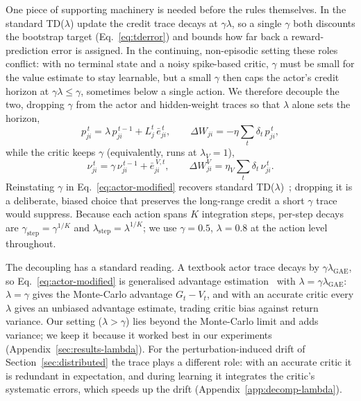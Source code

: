 \documentclass[10pt,twocolumn]{article}
\begin{document}
One piece of supporting machinery is needed before the rules themselves. In the
standard TD($\lambda$) update the credit trace decays at $\gamma\lambda$, so a
single $\gamma$ both discounts the bootstrap target (Eq.~\eqref{eq:tderror}) and
bounds how far back a reward-prediction error is assigned. In the continuing,
non-episodic setting these roles conflict: with no terminal state and a noisy
spike-based critic, $\gamma$ must be small for the value estimate to stay
learnable, but a small $\gamma$ then caps the actor's credit horizon at
$\gamma\lambda\le\gamma$, sometimes below a single action. We therefore decouple
the two, dropping $\gamma$ from the actor and hidden-weight traces so that
$\lambda$ alone sets the horizon,
\begin{equation}
p^{\,t}_{ji} = \lambda\, p^{\,t-1}_{ji} + L^t_j\,\bar e^{\,t}_{ji},
\qquad \Delta W_{ji} = -\eta\sum_t \delta_t\, p^{\,t}_{ji},
\label{eq:actor-modified}
\end{equation}
while the critic keeps $\gamma$ (equivalently, runs at $\lambda_V=1$),
\begin{equation}
\nu^{\,t}_{ji} = \gamma\,\nu^{\,t-1}_{ji} + \bar e^{\,V,t}_{ji},
\qquad \Delta W^V_{ji} = \eta_V\sum_t \delta_t\,\nu^{\,t}_{ji}.
\label{eq:critic-modified}
\end{equation}
Reinstating $\gamma$ in Eq.~\eqref{eq:actor-modified} recovers standard
TD($\lambda$)~\citep{SuttonBarto2018}; dropping it is a deliberate, biased choice that preserves the
long-range credit a short $\gamma$ trace would suppress. Because each action
spans $K$ integration steps, per-step decays are
$\gamma_{\mathrm{step}}=\gamma^{1/K}$ and
$\lambda_{\mathrm{step}}=\lambda^{1/K}$; we use $\gamma=0.5$, $\lambda=0.8$
at the action level throughout.

The decoupling has a standard reading. A textbook actor trace decays by
$\gamma\lambda_{\mathrm{GAE}}$, so Eq.~\eqref{eq:actor-modified} is generalised
advantage estimation~\citep{schulman2016gae} with $\lambda=\gamma\lambda_{\mathrm{GAE}}$:
$\lambda=\gamma$ gives the Monte-Carlo advantage $G_t-V_t$, and with an accurate
critic every $\lambda$ gives an unbiased advantage estimate, trading critic bias
against return variance. Our setting ($\lambda>\gamma$) lies beyond the
Monte-Carlo limit and adds variance; we keep it because it worked best in our
experiments (Appendix~\ref{sec:results-lambda}). For the perturbation-induced drift of
Section~\ref{sec:distributed} the trace plays a different role: with an accurate
critic it is redundant in expectation, and during learning it integrates the
critic's systematic errors, which speeds up the drift
(Appendix~\ref{app:decomp-lambda}).
\end{document}
